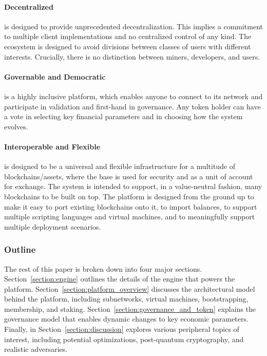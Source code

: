 \documentclass[runningheads]{llncs}
\begin{document}
\paragraph{Decentralized} \AVAPlatformName{} is designed to provide unprecedented decentralization. This implies a commitment to multiple client implementations and no centralized control of any kind. The ecosystem is designed to avoid divisions between classes of users with different interests. Crucially, there is no distinction between miners, developers, and users.

\paragraph{Governable and Democratic} \AVATokenName{} is a highly inclusive platform, which enables anyone to connect to its network and participate in validation and first-hand in governance. Any token holder can have a vote in selecting key financial parameters and in choosing how the system evolves.

\paragraph{Interoperable and Flexible} \AVAPlatformName{} is designed to be a universal and flexible infrastructure for a multitude of blockchains/assets, where the base \AVATokenName{} is used for security and as a unit of account for exchange. The system is intended to support, in a value-neutral fashion, many blockchains to be built on top. The platform is designed from the ground up to make it easy to port existing blockchains onto it, to import balances, to support multiple scripting languages and virtual machines, and to meaningfully support multiple deployment scenarios.

\subsubsection{Outline}
The rest of this paper is broken down into four major sections. Section~\ref{section:engine} outlines the details of the engine that powers the platform.  
Section~\ref{section:platform_overview} discusses the architectural model behind the platform, including subnetworks, virtual machines, bootstrapping, membership, and staking. 
Section~\ref{section:governance_and_token} explains the governance model that enables dynamic changes to key economic parameters.
Finally, in Section~\ref{section:discussion} explores various peripheral topics of interest, including potential optimizations, post-quantum cryptography, and realistic adversaries. 
\end{document}
